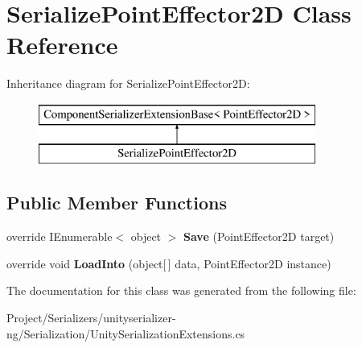 \hypertarget{class_serialize_point_effector2_d}{}\section{Serialize\+Point\+Effector2D Class Reference}
\label{class_serialize_point_effector2_d}
Inheritance diagram for Serialize\+Point\+Effector2D\+:\begin{figure}[H]
\begin{center}
\leavevmode
\includegraphics[height=2.000000cm]{class_serialize_point_effector2_d}
\end{center}
\end{figure}
\subsection*{Public Member Functions}
\begin{DoxyCompactItemize}
\item 
\mbox{\label{class_serialize_point_effector2_d_a013456d629025d927b70f26f3684d159}} 
override I\+Enumerable$<$ object $>$ {\bfseries Save} (Point\+Effector2D target)
\item 
\mbox{\label{class_serialize_point_effector2_d_a473636d957e184b107602f3f8c1c4b8d}} 
override void {\bfseries Load\+Into} (object\mbox{[}$\,$\mbox{]} data, Point\+Effector2D instance)
\end{DoxyCompactItemize}


The documentation for this class was generated from the following file\+:\begin{DoxyCompactItemize}
\item 
Project/\+Serializers/unityserializer-\/ng/\+Serialization/Unity\+Serialization\+Extensions.\+cs\end{DoxyCompactItemize}
